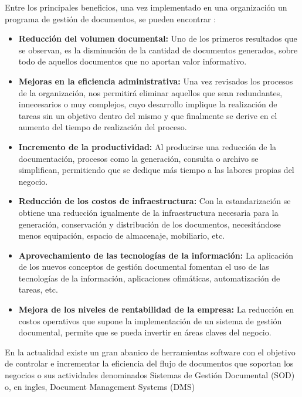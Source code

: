 Entre los principales beneficios, una vez implementado en una organización un programa de gestión de documentos, se pueden encontrar \cite{zapata}:
\begin{itemize}
\item \textbf{Reducción del volumen documental:} Uno de los primeros resultados que se observan, es la disminución de la cantidad de documentos generados, sobre todo de aquellos documentos que no aportan valor informativo. 
\item \textbf{Mejoras en la eficiencia administrativa:} Una vez revisados los procesos de la organización, nos permitirá eliminar aquellos que sean redundantes, innecesarios o muy complejos, cuyo desarrollo implique la realización de tareas sin un objetivo dentro del mismo y que finalmente se derive en el aumento del tiempo de realización del proceso. 
\item \textbf{Incremento de la productividad:} %
  Al producirse una reducción de la documentación, procesos como la  generación, consulta o archivo se simplifican, permitiendo que se dedique más tiempo a las labores propias del negocio.
\item \textbf{Reducción de los costos de infraestructura:} Con la estandarización se obtiene una reducción igualmente de  la infraestructura necesaria para la generación,  conservación y distribución de los documentos,  necesitándose menos equipación, espacio de almacenaje, mobiliario, etc. 
\item \textbf{Aprovechamiento de las tecnologías de la información:} La aplicación de los nuevos conceptos de gestión documental fomentan el uso de las tecnologías de la información, aplicaciones ofimáticas, automatización de tareas, etc. 
\item \textbf{Mejora de los niveles de rentabilidad de la empresa:} La reducción en costos operativos que supone la implementación de un sistema de gestión documental, permite que se pueda invertir en áreas claves del negocio.
\end{itemize}

En la actualidad existe un gran abanico de herramientas software con el objetivo de controlar e incrementar la eficiencia del flujo de documentos que soportan los negocios o sus actividades denominados Sistemas de Gestión Documental (SOD) o, en ingles, Document Management Systems (DMS)

